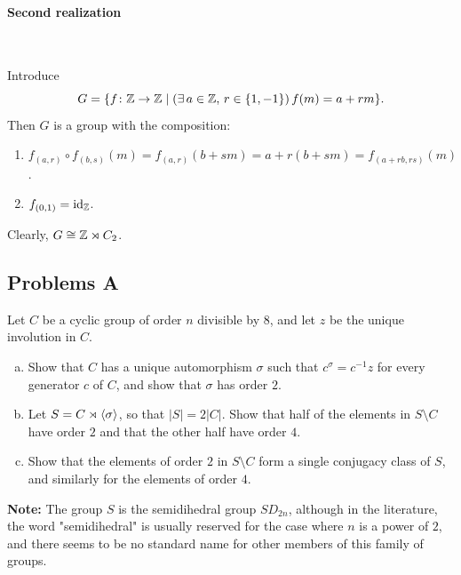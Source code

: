 \paragraph{Second realization}${}$

Introduce
$$
    G=\{f\colon\mathbb{Z}\to\mathbb{Z}\mid(\exists\,a\in\mathbb{Z},\,r\in\{1,-1\})\, f(m)=a+rm\}.
$$
Then $G$ is a group with the composition:
\begin{enumerate}[-]
    \item $f_{(a,r)}\circ f_{(b,s)}(m)=f_{(a,r)}(b+sm)=a+r(b+sm)= f_{(a+rb,rs)}(m)$.
    \item $f_{(0,1)}=\operatorname{id}_{\mathbb{Z}}$.
\end{enumerate}
Clearly, $G\cong\mathbb{Z}\rtimes C_2$.

\subsection{Problems A}

\begin{probl}
    Let\/ $C$ be a cyclic group of order\/ $n$ divisible by\/ $8$, and let\/ $z$ be the unique involution in\/ $C$.
    \begin{enumerate}[a),font=\upshape]
    \item Show that\/ $C$ has a unique automorphism\/ $\sigma$ such that\/ $c^\sigma = c^{-1}z$ for every generator\/ $c$ of\/ $C$, and show that\/ $\sigma$ has order\/ $2$.
    
    \item Let\/ $S = C\rtimes\langle\sigma\rangle$, so that\/ $|S| = 2|C|$. Show that half of the elements in\/ $S\setminus C$ have order\/ $2$ and that the other half have order\/ $4$.
    
    \item Show that the elements of order\/ $2$ in\/ $S\setminus C$ form a single conjugacy class of\/ $S$, and similarly for the elements of order\/ $4$.
    \end{enumerate}
    
    \textrm{\normalfont\textbf{Note:} The group $S$ is the semidihedral group $SD_{2n}$, although in the literature, the word "semidihedral" is usually reserved for the case where $n$ is a power of $2$, and there seems to be no standard name for other members of this family of groups.}
\end{probl}

